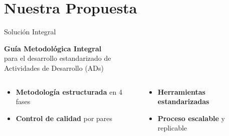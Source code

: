 \documentclass[10pt,aspectratio=169]{beamer}
\begin{document}
	\section{Nuestra Propuesta}
	
	\begin{frame}{Solución Integral}
		\begin{center}
			\Large
			\textcolor{azulUTQ}{\textbf{Guía Metodológica Integral}}\\
			\vspace{0.5cm}
			\normalsize
			para el desarrollo estandarizado de\\
			Actividades de Desarrollo (ADs)
		\end{center}
		
		\vspace{1cm}
		
		\begin{columns}
			\begin{column}{0.5\textwidth}
				\begin{itemize}
					\item \textbf{Metodología estructurada} en 4 fases
					\item \textbf{Control de calidad} por pares
				\end{itemize}
			\end{column}
			\begin{column}{0.5\textwidth}
				\begin{itemize}
					\item \textbf{Herramientas estandarizadas}
					\item \textbf{Proceso escalable} y replicable
				\end{itemize}
			\end{column}
		\end{columns}
	\end{frame}
	
\end{document}

